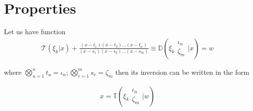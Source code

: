 \section{Properties}

\begin{definition}
        Let us have function
        \begin{align}
                \mathcal{T}(\xi_k |x) + \frac{(x-t_1)(x-t_2)...(x-t_n)}{(x-s_1)(x-s_2)
                ...(x-s_m)} \equiv \mathbb{D}\left( \xi_k \begin{matrix} \iota_n \\ 
                \zeta_m \end{matrix} \bigg| x \right)=w
        \end{align}
        
        where \(\bigotimes_{u=1}^n t_u = \iota_n; \bigotimes_{r=1}^m s_r = \zeta_m\)
        then its inversion can be written in the form
        
        \begin{align}
                x = \mathbb{T}\left( \xi_k \begin{matrix} \iota_n \\ 
                \zeta_m \end{matrix} \bigg| w \right)
        \end{align}
\end{definition}

